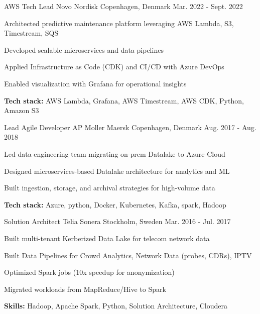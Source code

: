 \begin{cventries}

\cventry
{AWS Tech Lead} %
{Novo Nordisk} %
{Copenhagen, Denmark} %
{Mar. 2022 - Sept. 2022} %
{ %
\begin{cvitems}
\item Architected predictive maintenance platform leveraging AWS Lambda, S3, Timestream, SQS
\item Developed scalable microservices and data pipelines
\item Applied Infrastructure as Code (CDK) and CI/CD with Azure DevOps
\item Enabled visualization with Grafana for operational insights
\item \textbf{Tech stack:} AWS Lambda, Grafana, AWS Timestream, AWS CDK, Python, Amazon S3
\end{cvitems}
}



\cventry
{Lead Agile Developer} %
{AP Moller Maersk} %
{Copenhagen, Denmark} %
{Aug. 2017 - Aug. 2018} %
{ %
\begin{cvitems}
\item Led data engineering team migrating on-prem Datalake to Azure Cloud
\item Designed microservices-based Datalake architecture for analytics and ML
\item Built ingestion, storage, and archival strategies for high-volume data
\item \textbf{Tech stack:} Azure, python, Docker, Kubernetes, Kafka, spark, Hadoop
\end{cvitems}
}



\cventry
{Solution Architect} %
{Telia Sonera} %
{Stockholm, Sweden} %
{Mar. 2016 - Jul. 2017} %
{ %
\begin{cvitems}
\item Built multi-tenant Kerberized Data Lake for telecom network data
\item Built Data Pipelines for Crowd Analytics, Network Data (probes, CDRs), IPTV 
\item Optimized Spark jobs (10x speedup for anonymization)
\item Migrated workloads from MapReduce/Hive to Spark
\item \textbf{Skills:} Hadoop, Apache Spark, Python, Solution Architecture, Cloudera
\end{cvitems}
}


\end{cventries}

